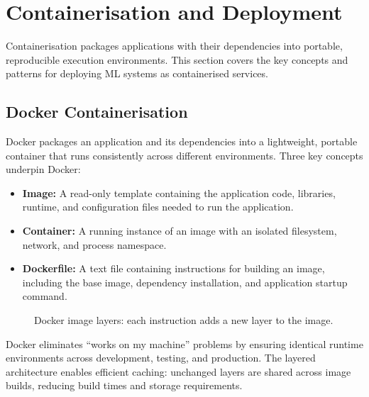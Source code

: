 \documentclass[10pt,a4paper]{article}
\begin{document}
\section{Containerisation and Deployment}
\label{sec:containerisation}

Containerisation packages applications with their dependencies into portable, reproducible execution environments. This section covers the key concepts and patterns for deploying ML systems as containerised services.

\subsection{Docker Containerisation}
\label{section:docker}

Docker packages an application and its dependencies into a lightweight, portable container that runs consistently across different environments. Three key concepts underpin Docker:

\begin{itemize}
    \item \textbf{Image:} A read-only template containing the application code, libraries, runtime, and configuration files needed to run the application.
    \item \textbf{Container:} A running instance of an image with an isolated filesystem, network, and process namespace.
    \item \textbf{Dockerfile:} A text file containing instructions for building an image, including the base image, dependency installation, and application startup command.
\end{itemize}

\begin{figure}[H]
    \centering
    \caption{Docker image layers: each instruction adds a new layer to the image.}
    \label{fig:docker-layers}
\end{figure}

Docker eliminates ``works on my machine'' problems by ensuring identical runtime environments across development, testing, and production. The layered architecture enables efficient caching: unchanged layers are shared across image builds, reducing build times and storage requirements.
\end{document}
